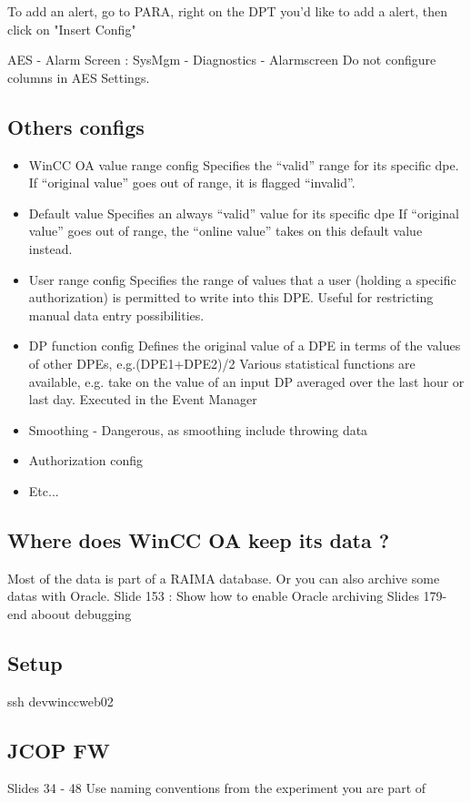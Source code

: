 \documentclass[a4paper, 10pt]{article}
\begin{document}
To add an alert, go to PARA, right on the DPT you'd like to add a alert, then click on "Insert Config"

AES - Alarm Screen : SysMgm - Diagnostics - Alarmscreen
Do not configure columns in AES Settings.

\subsection{Others configs}
\begin{itemize}
    \item WinCC OA value range config
Specifies the “valid” range for its specific dpe.
If “original value” goes out of range, it is flagged “invalid”. 
    \item Default value
Specifies an always “valid” value for its specific dpe
If “original value” goes out of range, the “online value” takes on this default value instead.
    \item User range config
Specifies the range of values that a user (holding a specific authorization) is permitted to
write into this DPE. Useful for restricting manual data entry possibilities.
    \item DP function config
Defines the original value of a DPE in terms of the values of other DPEs, e.g.(DPE1+DPE2)/2
Various statistical functions are available, e.g. take on the value of an input DP averaged over the last hour or last day. Executed in the Event Manager
    \item Smoothing - Dangerous, as smoothing include throwing data
    \item Authorization config
    \item Etc...
\end{itemize}

\subsection{Where does WinCC OA keep its data ?}
Most of the data is part of a RAIMA database. Or you can also archive some datas with Oracle.
Slide 153 : Show how to enable Oracle archiving
Slides 179-end aboout debugging

\subsection*{Setup}
ssh devwinccweb02

\subsection*{JCOP FW}
Slides 34 - 48
Use naming conventions from the experiment you are part of
\end{document}
